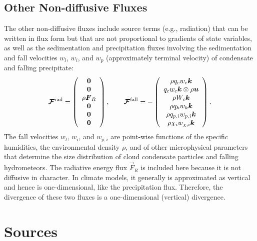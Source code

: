 \documentclass{report}
\begin{document}
\subsection{Other Non-diffusive Fluxes}

The other non-diffusive fluxes include source terms (e.g., radiation) that can be written in flux form but that are not proportional to gradients of state variables, as well as the sedimentation and precipitation fluxes involving the sedimentation and fall velocities $w_l$, $w_i$, and $w_p$ (approximately terminal velocity) of condensate and falling precipitate:
\begin{equation}
\boldsymbol{{\mathcal{F}}}^{\mathrm{rad}} = 
\left( \begin{array}{c}
\boldsymbol{{0}} \\
\boldsymbol{{0}} \\
\rho \boldsymbol{{F}}_R \\
\boldsymbol{{0}} \\
\boldsymbol{{0}} \\
\boldsymbol{{0}} 
\end{array}
\right), \qquad
\boldsymbol{{\mathcal{F}}}^{\mathrm{fall}} = 
- \left( \begin{array}{c}
\rho q_{c} w_{c} \boldsymbol{{k}}  \\
q_c w_c \boldsymbol{{k}} \otimes \rho \boldsymbol{{u}}  \\
\rho W_c \boldsymbol{{k}} \\
\rho q_{k} w_{k} \boldsymbol{{k}}  \\
\rho q_{p,i} w_{p, i} \boldsymbol{{k}} \\
\rho \chi_{i} w_{\chi, i} \boldsymbol{{k}} 
\end{array}
\right).
\label{eq:ndf_flux}
\end{equation}
The fall velocities $w_l$, $w_i$, and $w_{p, i}$ are point-wise functions of the specific humidities, the environmental density $\rho$, and of other microphysical parameters that determine the size distribution of cloud condensate particles and falling hydrometeors. The radiative energy flux $\vec{F}_R$ is included here because it is not diffusive in character. In climate models, it generally is approximated as vertical and hence is one-dimensional, like the precipitation flux. Therefore, the divergence of these two fluxes is a one-dimensional (vertical) divergence. 

\section{Sources}
\end{document}
